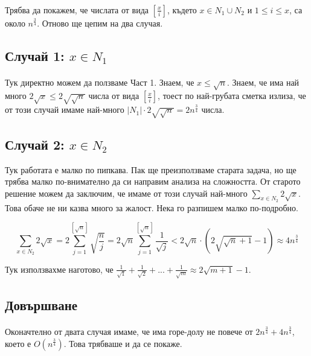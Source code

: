 \documentclass[12pt]{article}
\begin{document}
\paragraph*{}
Трябва да покажем, че числата от вида $[\frac{x}{i}]$, където $x \in N_1 \cup N_2$ и $1 \leq i \leq x$, са около $n^{\frac{3}{4}}$. 
Отново ще цепим на два случая.

\subsection*{Случай 1: $x \in N_1$}
\paragraph*{}
Тук директно можем да ползваме Част 1. Знаем, че $x \leq \sqrt{n}$. Знаем, че има най много $2 \sqrt{x} \leq 2 \sqrt{\sqrt{n}}$ числа от вида $[\frac{x}{i}]$, тоест по най-грубата сметка излиза, че от този случай имаме най-много $|N_1| \cdot 2 \sqrt{\sqrt{n}} = 2 n^{\frac{3}{4}}$ числа.

\subsection*{Случай 2: $x \in N_2$}  
Тук работата е малко по пипкава. Пак ще преизползваме старата задача, но ще трябва малко по-внимателно да си направим анализа на сложността. От старото решение можем да заключим, че имаме от този случай най-много $\displaystyle\sum_{x \in N_2} 2 \sqrt{x}$. Това обаче не ни казва много за жалост. Нека го разпишем малко по-подробно. 

\begin{equation*}
    \displaystyle\sum_{x \in N_2} 2 \sqrt{x} = 2\displaystyle\sum_{j=1}^{[\sqrt{n}]} \sqrt{\frac{n}{j}} = 2 \sqrt{n} \displaystyle\sum_{j=1}^{[\sqrt{n}]} \frac{1}{\sqrt{j}} < 2 \sqrt{n} \cdot (2 \sqrt{\sqrt{n}+1} - 1) \approx 4 n^{\frac{3}{4}}
\end{equation*}

Тук използвахме наготово, че $\frac{1}{\sqrt{1}} + \frac{1}{\sqrt{2}} + ... + \frac{1}{\sqrt{m}} \approx 2\sqrt{m+1} - 1$.

\subsection*{Довършване}
\paragraph*{}
Оконачтелно от двата случая имаме, че има горе-долу не повече от $2 n^{\frac{3}{4}} + 4 n^{\frac{3}{4}}$, което е $O(n^{\frac{3}{4}})$. Това трябваше и да се покаже.
\end{document}
